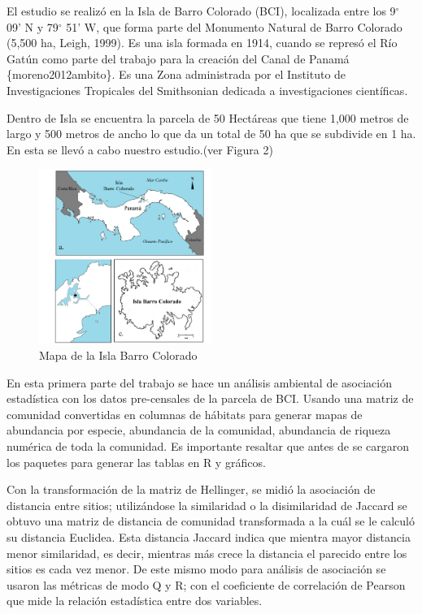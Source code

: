 \documentclass[11pt,]{article}
\begin{document}
El estudio se realizó en la Isla de Barro Colorado (BCI), localizada
entre los 9\(^{\circ}\) 09' N y 79\(^{\circ}\) 51' W, que forma parte
del Monumento Natural de Barro Colorado (5,500 ha, Leigh, 1999). Es una
isla formada en 1914, cuando se represó el Río Gatún como parte del
trabajo para la creación del Canal de Panamá \{moreno2012ambito\}. Es
una Zona administrada por el Instituto de Investigaciones Tropicales del
Smithsonian dedicada a investigaciones científicas.

Dentro de Isla se encuentra la parcela de 50 Hectáreas que tiene 1,000
metros de largo y 500 metros de ancho lo que da un total de 50 ha que se
subdivide en 1 ha. En esta se llevó a cabo nuestro estudio.(ver Figura
2)

\begin{figure}
\centering
\includegraphics[width=0.50000\textwidth]{isla_barro_colorado_mapa.png}
\caption{Mapa de la Isla Barro Colorado}
\end{figure}

En esta primera parte del trabajo se hace un análisis ambiental de
asociación estadística con los datos pre-censales de la parcela de BCI.
Usando una matriz de comunidad convertidas en columnas de hábitats para
generar mapas de abundancia por especie, abundancia de la comunidad,
abundancia de riqueza numérica de toda la comunidad. Es importante
resaltar que antes de se cargaron los paquetes para generar las tablas
en R y gráficos.

Con la transformación de la matriz de Hellinger, se midió la asociación
de distancia entre sitios; utilizándose la similaridad o la
disimilaridad de Jaccard se obtuvo una matriz de distancia de comunidad
transformada a la cuál se le calculó su distancia Euclidea. Esta
distancia Jaccard indica que mientra mayor distancia menor similaridad,
es decir, mientras más crece la distancia el parecido entre los sitios
es cada vez menor. De este mismo modo para análisis de asociación se
usaron las métricas de modo Q y R; con el coeficiente de correlación de
Pearson que mide la relación estadística entre dos variables.
\end{document}
